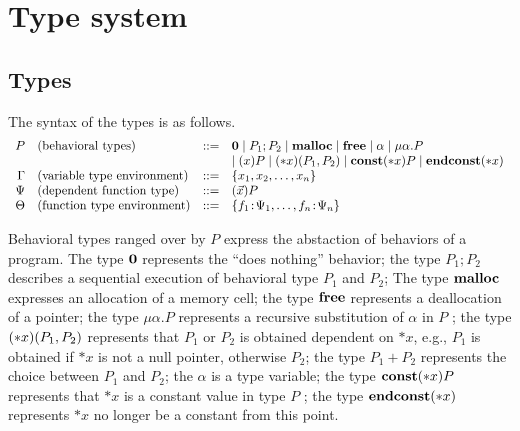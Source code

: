 \section{Type system}
\label{sec:typesystem}

\subsection{Types}
The syntax of the types is as follows.
\[
\begin{array}{rlcl}
  P & (\mbox{behavioral types})&::=& {\bf 0} \mid P_{1};P_{2} \mid \mathbf{malloc}\mid \mathbf{free} \mid \alpha \mid \mu\alpha.P \\
  &  &  & \mid (x)P \mid (*x)(P_1,P_2) \mid \mathbf{const}(*x) P  \mid \mathbf{endconst}(*x)\\
  \Gamma & (\mbox{variable type environment}) &::=& \{x_1, x_2, \dots, x_n\}\\
  \Psi & (\mbox{dependent function type}) &::=& (\vec{x})P\\
  \Theta & (\mbox{function type environment}) &::=& \{f_1\!:\! \Psi_1,\dots,f_n\!:\! \Psi_n\}\\
\end{array}
\]

Behavioral types ranged over by \(P\) express the abstaction of
behaviors of a program. The type \({\bf 0}\) represents the “does
nothing” behavior; the type \(P_1;P_2\) describes a sequential
execution of behavioral type \(P_1\) and \(P_2\); The type \(\mathbf{malloc}\)
expresses an allocation of a memory cell; the type \(\mathbf{free}\)
represents a deallocation of a pointer; the type \(\mu \alpha.P\)
represents a recursive substitution of \(\alpha\) in \(P\) ; the type
\((*x)(P_1,P_2)\) represents that \(P_1\) or \(P_2\) is obtained
dependent on \(*x\), e.g., \(P_1\) is obtained if \(*x\) is not a null
pointer, otherwise \(P_2\); the type \(P_1 + P_2\) represents the
choice between \(P_1\) and \(P_2\); the \(\alpha\) is a type variable;
the type \(\mathbf{const}(*x) P\) represents that \(*x\) is a constant value
in type \(P\) ; the type \(\mathbf{endconst}(*x)\) represents \(*x\) no longer be
a constant from this point.


